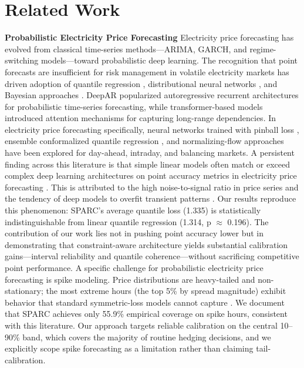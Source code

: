 \documentclass[twoside]{article}
\begin{document}
\section{Related Work}
\textbf{Probabilistic Electricity Price Forecasting}
Electricity price forecasting has evolved from classical time-series methods---ARIMA, GARCH, and regime-switching models---toward probabilistic deep learning. The recognition that point forecasts are insufficient for risk management in volatile electricity markets \cite{bessa2017improved} has driven adoption of quantile regression \cite{taieb2016forecasting}, distributional neural networks \cite{toubeau2018deep}, and Bayesian approaches \cite{brusaferri2019bayesian}. DeepAR \cite{wen2017multihorizon} popularized autoregressive recurrent architectures for probabilistic time-series forecasting, while transformer-based models \cite{lim2020temporal, cantilloluna2023intraday} introduced attention mechanisms for capturing long-range dependencies. In electricity price forecasting specifically, neural networks trained with pinball loss \cite{marcjasz2023distributional}, ensemble conformalized quantile regression \cite{jensen2022ensemble}, and normalizing-flow approaches \cite{hilger2023multivariate} have been explored for day-ahead, intraday, and balancing markets.
A persistent finding across this literature is that simple linear models often match or exceed complex deep learning architectures on point accuracy metrics in electricity price forecasting \cite{uniejewski2018efficient, marcjasz2020neural}. This is attributed to the high noise-to-signal ratio in price series and the tendency of deep models to overfit transient patterns \cite{lago2020forecasting}. Our results reproduce this phenomenon: SPARC's average quantile loss (1.335) is statistically indistinguishable from linear quantile regression (1.314, p $\approx$ 0.196). The contribution of our work lies not in pushing point accuracy lower but in demonstrating that constraint-aware architecture yields substantial calibration gains---interval reliability and quantile coherence---without sacrificing competitive point performance.
A specific challenge for probabilistic electricity price forecasting is spike modeling. Price distributions are heavy-tailed and non-stationary; the most extreme hours (the top 5\% by spread magnitude) exhibit behavior that standard symmetric-loss models cannot capture \cite{stathakis2021forecasting, sheybanivaziri2024forecasting}. We document that SPARC achieves only 55.9\% empirical coverage on spike hours, consistent with this literature. Our approach targets reliable calibration on the central 10--90\% band, which covers the majority of routine hedging decisions, and we explicitly scope spike forecasting as a limitation rather than claiming tail-calibration.
\end{document}
